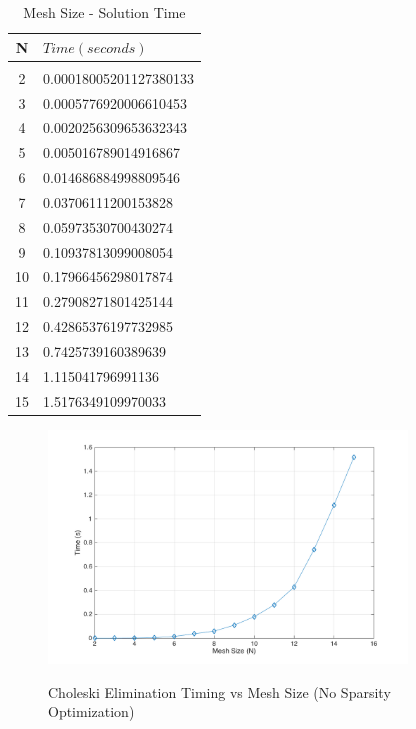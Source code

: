 \documentclass[11pt]{amsart}
\begin{document}
\begin{table}[h!]
    \caption{Mesh Size - Solution Time}
    \label{tbl:time_v_mesh}
    \begin{tabular}{ c| l}
    	\textbf{N} & \textbf{$Time (seconds)$}\\ \hline \\
	2 & 0.00018005201127380133\\
	3 & 0.0005776920006610453\\
	4 & 0.0020256309653632343\\
	5 & 0.005016789014916867\\
	6 & 0.014686884998809546\\
	7 & 0.03706111200153828\\
	8 & 0.05973530700430274\\
	9 & 0.10937813099008054\\
	10 & 0.17966456298017874\\
	11 & 0.27908271801425144\\
	12 & 0.42865376197732985\\
	13 & 0.7425739160389639\\
	14 & 1.115041796991136\\
	15 & 1.5176349109970033
    \end{tabular}
\end{table}
\begin{center}
	\begin{figure}[h]
		\caption{Choleski Elimination Timing vs Mesh Size (No Sparsity Optimization)}
		\includegraphics[width=0.85\textwidth]{assets/t_vs_n_unopt.png}\label{fig:t_n_unopt}
	\end{figure}
\end{center}
\end{document}
